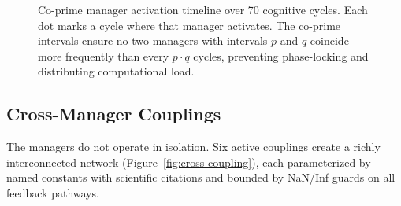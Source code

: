 \documentclass[12pt]{book}
\begin{document}
\begin{figure}[H]
\centering
{}
\caption{Co-prime manager activation timeline over 70 cognitive cycles. Each dot marks a cycle where that manager activates. The co-prime intervals ensure no two managers with intervals $p$ and $q$ coincide more frequently than every $p \cdot q$ cycles, preventing phase-locking and distributing computational load.}
\label{fig:manager-timeline}
\end{figure}

\subsection{Cross-Manager Couplings}

The managers do not operate in isolation. Six active couplings create a richly interconnected network (Figure~\ref{fig:cross-coupling}), each parameterized by named constants with scientific citations and bounded by NaN/Inf guards on all feedback pathways.
\end{document}
